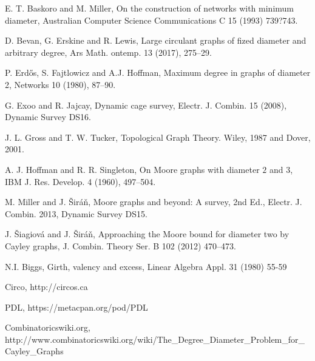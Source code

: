 \documentclass[a4paper,12pt,oneside]{report}%
\begin{document}
\begin{thebibliography}{xx}

 E. T. Baskoro and M. Miller, On the construction of networks with minimum diameter,
Australian Computer Science Communications C 15 (1993) 739?743.

 D. Bevan, G. Erskine and R. Lewis, Large circulant graphs of fized diameter and arbitrary degree, Ars Math. ontemp. 13 (2017), 275--29.

 P. Erd{\H o}s, S. Fajtlowicz and A.J. Hoffman,
Maximum degree in graphs of diameter 2, Networks 10
(1980), 87--90.

 G. Exoo and R. Jajcay, Dynamic cage survey, Electr. J. Combin. 15 (2008), Dynamic Survey DS16.

 J. L. Gross and T. W. Tucker, Topological Graph Theory. Wiley, 1987 and Dover, 2001.

 A. J. Hoffman and R. R. Singleton, On Moore graphs with diameter $2$ and $3$, IBM J. Res. Develop. 4 (1960), 497--504.

 M. Miller and J. \v{S}ir\'a\v{n},  Moore graphs and beyond: A survey, 2nd Ed., Electr. J. Combin. 2013, Dynamic Survey DS15.

 J. \v{S}iagiov\'a and J. \v{S}ir\'a\v{n}, Approaching the Moore bound for diameter two by Cayley graphs, J. Combin. Theory Ser. B 102 (2012) 470--473.

 N.I. Biggs, Girth, valency and excess, Linear Algebra Appl. 31 (1980) 55-59

 Circo, http://circos.ca

 PDL, https://metacpan.org/pod/PDL

 Combinatoricswiki.org, http://www.combinatoricswiki.org/wiki/The\_Degree\_Diameter\_Problem\_for\_Cayley\_Graphs 

\end{thebibliography}
\end{document}
